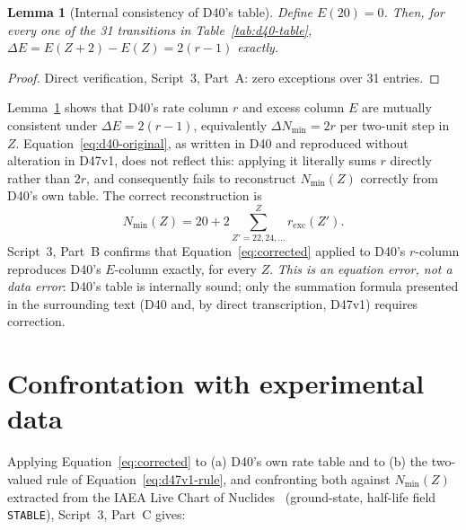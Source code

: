 \documentclass[12pt,a4paper]{article}
\theoremstyle{plain}
\newtheorem{lemma}[theorem]{Lemma}
\theoremstyle{definition}
\theoremstyle{remark}
\newenvironment{correctionbox}[1][]{%
\begin{tcolorbox}[correctionstyle,title={Correction\ifx\relax#1\relax\else: #1\fi}]}{\end{tcolorbox}}
\newcommand{\Nmin}{N_{\min}}
\newcommand{\rexc}{r_{\mathrm{exc}}}
\begin{document}
\begin{lemma}[Internal consistency of D40's table]
\label{lem:consistent}
Define $E(20)=0$. Then, for every one of the 31 transitions in Table~\ref{tab:d40-table}, $\Delta E = E(Z{+}2)-E(Z) = 2(r-1)$ exactly.
\end{lemma}

\begin{proof}
Direct verification, Script~3, Part~A: zero exceptions over 31 entries.
\end{proof}

\begin{correctionbox}[Missing factor of two]
Lemma~\ref{lem:consistent} shows that D40's rate column $r$ and excess column $E$ are mutually consistent under $\Delta E=2(r-1)$, equivalently $\Delta\Nmin=2r$ per two-unit step in $Z$. Equation~\eqref{eq:d40-original}, as written in D40 and reproduced without alteration in D47v1, does not reflect this: applying it literally sums $r$ directly rather than $2r$, and consequently fails to reconstruct $\Nmin(Z)$ correctly from D40's own table. The correct reconstruction is
\begin{equation}
\Nmin(Z) = 20 + 2\sum_{Z'=22,24,\ldots}^{Z} \rexc(Z').
\label{eq:corrected}
\end{equation}
Script~3, Part~B confirms that Equation~\eqref{eq:corrected} applied to D40's $r$-column reproduces D40's $E$-column exactly, for every $Z$. \emph{This is an equation error, not a data error}: D40's table is internally sound; only the summation formula presented in the surrounding text (D40 and, by direct transcription, D47v1) requires correction.
\end{correctionbox}

\section{Confrontation with experimental data}
\label{sec:confrontation}

Applying Equation~\eqref{eq:corrected} to (a) D40's own rate table and to (b) the two-valued rule of Equation~\eqref{eq:d47v1-rule}, and confronting both against $\Nmin(Z)$ extracted from the IAEA Live Chart of Nuclides~\citep{IAEA_LiveChart_2026} (ground-state, half-life field \texttt{STABLE}), Script~3, Part~C gives:
\end{document}
